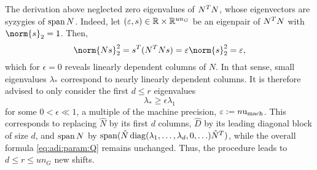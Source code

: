 The derivation above neglected zero eigenvalues of $N^T N$,
whose eigenvectors are syzygies of $\operatorname{span} N$.
Indeed, let $(\varepsilon,s)\in\mathbb{R}\times\mathbb{R}^{un_G}$ be an eigenpair of $N^T N$ with $\norm{s}_2 = 1$.
Then,
\begin{equation}
  \norm{Ns}_2^2
  = s^\T (N^\T N s)
  = \epsilon\norm{s}_2^2
  = \epsilon
  ,
\end{equation}
which for $\epsilon=0$ reveals linearly dependent columns of $N$.
In that sense, small eigenvalues $\lambda_*$ correspond to nearly linearly dependent columns.
It is therefore advised to only consider the first $d \leq r$ eigenvalues
\begin{equation}
  \lambda_* \geq \epsilon \lambda_1
\end{equation}
for some $0 < \epsilon \ll 1$,
\eg a multiple of the machine precision,
$\varepsilon := n\mathrm u_\text{mach}$.
This corresponds to replacing
$\hat N$ by its first $d$ columns,
$\hat D$ by its leading diagonal block of size $d$,
and $\operatorname{span} N$ by $\operatorname{span}(\hat N \operatorname{diag}(\lambda_1, \ldots, \lambda_d, 0, \ldots) \hat N^T)$,
while the overall formula \eqref{eq:adi:param:Q} remains unchanged.
Thus, the procedure leads to $d \leq r \leq un_G$ new shifts.


